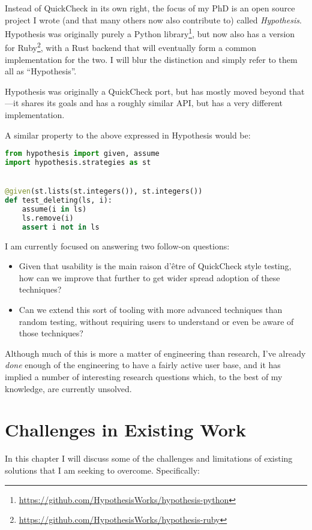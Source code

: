 Instead of QuickCheck in its own right,
the focus of my PhD is an open source project I wrote (and that many others now also contribute to) called \emph{Hypothesis}.
Hypothesis was originally purely a Python library\footnote{\url{https://github.com/HypothesisWorks/hypothesis-python}},
but now also has a version for Ruby\footnote{\url{https://github.com/HypothesisWorks/hypothesis-ruby}},
with a Rust backend that will eventually form a common implementation for the two.
I will blur the distinction and simply refer to them all as ``Hypothesis''.

Hypothesis was originally a QuickCheck port,
but has mostly moved beyond that---it
shares its goals and has a roughly similar API,
but has a very different implementation.

A similar property to the above expressed in Hypothesis would be:

\begin{lstlisting}[language=Python]
from hypothesis import given, assume
import hypothesis.strategies as st


@given(st.lists(st.integers()), st.integers())
def test_deleting(ls, i):
    assume(i in ls)
    ls.remove(i)
    assert i not in ls
\end{lstlisting}

I am currently focused on answering two follow-on questions:

\begin{itemize}
\item Given that usability is the main raison d'être of QuickCheck style testing,
how can we improve that further to get wider spread adoption of these techniques?
\item Can we extend this sort of tooling with more advanced techniques than random testing,
without requiring users to understand or even be aware of those techniques?
\end{itemize}

Although much of this is more a matter of engineering than research,
I've already \emph{done} enough of the engineering to have a fairly active user base,
and it has implied a number of interesting research questions which,
to the best of my knowledge,
are currently unsolved.

\chapter{Challenges in Existing Work}

In this chapter I will discuss some of the challenges and limitations of existing solutions that I am seeking to overcome.
Specifically:

